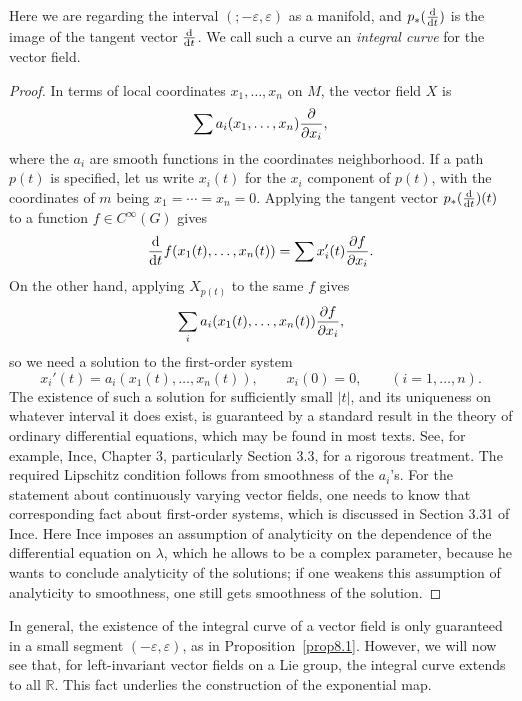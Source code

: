 \documentclass[12pt,reqno]{book}%
\theoremstyle{definition}
\theoremstyle{remark}
\theoremstyle{theorem}
\theoremstyle{remark}
\begin{document}
Here we are regarding the interval $(;-\varepsilon, \varepsilon)$ as a manifold, and $p_*(\dv{t})$ is the image of the tangent vector $\dv{t}$.
We call such a curve an \emph{integral curve} for the vector field.
\begin{proof}%
    In terms of local coordinates $x_1, \ldots, x_n$ on $M$, the vector field $X$ is
    \[
        \sum a_i(x_1, \ldots, x_n) \pdv{x_i},
    \]
    where the $a_i$ are smooth functions in the coordinates neighborhood.
    If a path $p(t)$ is specified, let us write $x_i(t)$ for the $x_i$ component of $p(t)$, with the coordinates of $m$ being $x_1 = \cdots = x_n = 0$.
    Applying the tangent vector $p_*(\dv{t})(t)$ to a function $f \in C^\infty(G)$ gives
    \[
        \dv{t}f(x_1(t), \ldots, x_n(t)) = \sum x_i'(t) \pdv{f}{x_i}(x_1(t), \ldots, x_n(t)).
    \]
    On the other hand, applying $X_{p(t)}$ to the same $f$ gives
    \[
        \sum_{i} a_i(x_1(t), \ldots, x_n(t)) \pdv{f}{x_i}(x_1(t), \ldots, x_n(t)),
    \]
    so we need a solution to the first-order system
    \[
        x_i'(t) = a_i(x_1(t), \ldots, x_n(t)), \qquad x_i(0) = 0, \qquad (i = 1, \ldots, n).
    \]
    The existence of such a solution for sufficiently small $|t|$, and its uniqueness on whatever interval it does exist, is guaranteed by a standard result in the theory of ordinary differential equations, which may be found in most texts.
    See, for example, Ince, Chapter 3, particularly Section 3.3, for a rigorous treatment.
    The required Lipschitz condition follows from smoothness of the $a_i$'s.
    For the statement about continuously varying vector fields, one needs to know that corresponding fact about first-order systems, which is discussed in Section 3.31 of Ince.
    Here Ince imposes an assumption of analyticity on the dependence of the differential equation on $\lambda$, which he allows to be a complex parameter, because he wants to conclude analyticity of the solutions; if one weakens this assumption of analyticity to smoothness, one still gets smoothness of the solution.
\end{proof}%

In general, the existence of the integral curve of a vector field is only guaranteed in a small segment $(-\varepsilon, \varepsilon)$, as in Proposition~\ref{prop8.1}.
However, we will now see that, for left-invariant vector fields on a Lie group, the integral curve extends to all $\mathbb{R}$.
This fact underlies the construction of the exponential map.
\end{document}
